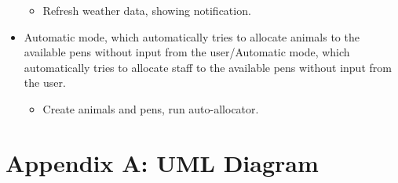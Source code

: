 \documentclass[english,a4paper,]{report}
\providecommand{\tightlist}{%
  \setlength{\itemsep}{0pt}\setlength{\parskip}{0pt}}
\begin{document}
\begin{itemize}
  \begin{itemize}
  \tightlist
  \item
    Refresh weather data, showing notification.
  \end{itemize}
\item
  Automatic mode, which automatically tries to allocate animals to the
  available pens without input from the user/Automatic mode, which
  automatically tries to allocate staff to the available pens without
  input from the user.

  \begin{itemize}
  \tightlist
  \item
    Create animals and pens, run auto-allocator.
  \end{itemize}
\end{itemize}

\hypertarget{appendix-a-uml-diagram}{%
\chapter{Appendix A: UML Diagram}\label{appendix-a-uml-diagram}}
\end{document}
